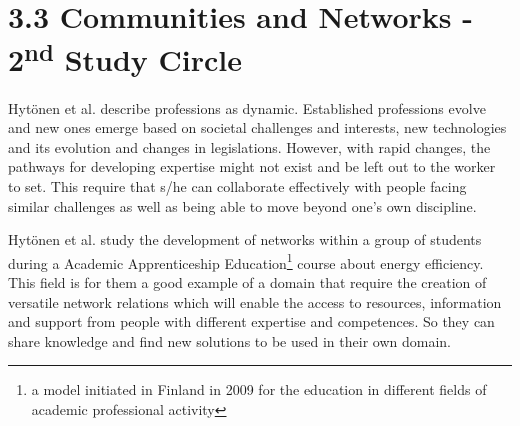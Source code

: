 \section*{3.3 Communities and Networks - 2\textsuperscript{nd} Study Circle}

Hytönen et al. \cite{hytonen2014does} describe professions as dynamic. Established professions evolve and new ones emerge based on societal challenges and interests, new technologies and its evolution and changes in legislations. However, with rapid changes, the pathways for developing expertise might not exist and be left out to the worker to set. This require that s/he can collaborate effectively with people facing similar challenges as well as being able to move beyond one's own discipline.

Hytönen et al. \cite{hytonen2014does} study the development of networks within a group of students during a Academic Apprenticeship Education\footnote{a model initiated in Finland in 2009 for the education in different fields of academic professional activity} course about energy efficiency. This field is for them a good example of a domain that require the creation of versatile network relations which will enable the access to resources, information and
support from people with different expertise and competences. So they can share knowledge and find new solutions to be used in their own domain.

